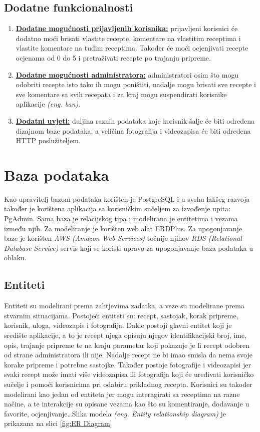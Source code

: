 \documentclass[times, utf8, zavrsni]{fer}
\begin{document}
\section{Dodatne funkcionalnosti}
\begin{enumerate}
      \item \textbf{\underline{Dodatne mogućnosti prijavljenih korisnika:}} prijavljeni korisnici će
            dodatno moći brisati vlastite recepte, komentare na vlastitim receptima i vlastite komentare
            na tuđim receptima. Također će moći ocjenjivati recepte ocjenama od 0 do 5 i pretraživati
            recepte po trajanju pripreme.
      \item \textbf{\underline{Dodatne mogućnosti administratora:}} administratori osim što mogu odobriti
            recepte isto tako ih mogu poništiti, nadalje mogu brisati sve recepte i sve komentare sa svih recepata
            i za kraj mogu suspendirati korisnike aplikacije \textit{(eng. ban)}.
      \item \textbf{\underline{Dodatni uvjeti:}} duljina raznih podataka koje korisnik šalje će biti
            određena dizajnom baze podataka, a veličina fotografija i videozapisa će biti određena
            HTTP poslužiteljem.
\end{enumerate}
\chapter{Baza podataka}
Kao upravitelj bazom podataka korišten je PostgreSQL i u svrhu lakšeg razvoja također
je korištena aplikacija sa korisničkim sučeljem za izvođenje upita: PgAdmin.
Sama baza je relacijskog tipa i modelirana je entitetima i vezama između njih.
Za modeliranje je korišten web alat ERDPlus. Za upogonjavanje baze je korišten \textit{AWS (Amazon Web Services)}
točnije njihov \textit{RDS (Relational Database Service)} servis koji se koristi upravo za upogonjavanje baza podataka u oblaku.

\section{Entiteti}
Entiteti su modelirani prema zahtjevima zadatka, a veze su modelirane prema stvarnim situacijama.
Postojeći entiteti su: recept, sastojak, korak pripreme, korisnik, uloga, videozapis i
fotografija. Dakle postoji glavni entitet koji je središte aplikacije, a to je recept
njega opisuju njegov identifikacijski broj, ime, opis, trajanje pripreme
te na kraju parametar koji pokazuje je li recept odobren od strane administratora ili nije.
Nadalje recept ne bi imao smisla da nema svoje korake pripreme i potrebne sastojke.
Također postoje fotografije i videozapisi jer svaki recept može imati
više videozapisa ili fotografija koji će uređivati korisničko sučelje
i pomoći korisnicima pri odabiru prikladnog recepta.
Korisnici su također modelirani kao jedan od entiteta jer mogu interagirati sa receptima
na razne načine, a te interakcije su opisane vezama kao što su komentiranje,
dodavanje u favorite, ocjenjivanje\dots Slika modela \textit{(eng. Entity relationship diagram)}
je prikazana na slici \ref{fig:ER Diagram}
\end{document}
